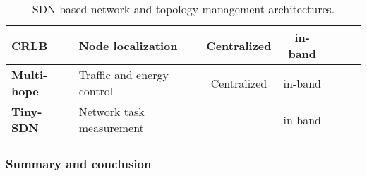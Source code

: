 \begin{table}[h!]
\begin{tabulary}{\columnwidth}{L|L|C|C|C|C|C}
	\textbf{CRLB}                                    & Node localization                      & Centralized                       & in-band                  &                                       &                                       & \\\hline
	\textbf{Multi-hope}                              & Traffic and energy control             & Centralized                       & in-band                  &                                       &                                       & \ok                              \\\hline
	\textbf{Tiny-SDN}                                & Network task measurement               & -                                 & in-band                  &                                       &                                       & \\
	\end{tabulary}
	\caption{\label{tab:Tableuy} SDN-based network and topology management architectures. \cite{ndiaye_software_2017}}
\end{table}








\subsubsection{Summary and conclusion}


